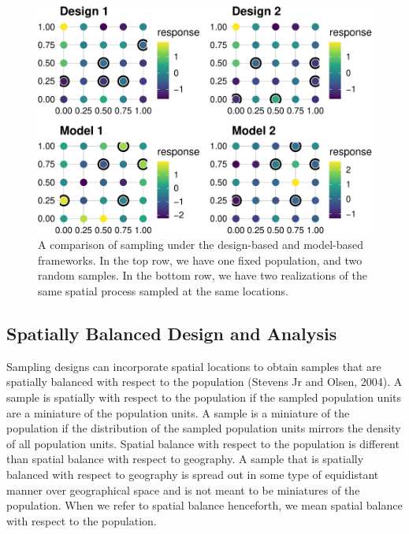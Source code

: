 \documentclass[]{elsarticle} %
\begin{document}
\begin{figure}
\includegraphics[width=1\linewidth]{SpatialDVM_Manuscript_files/figure-latex/unnamed-chunk-2-1} \caption{A comparison of sampling under the design-based and model-based frameworks. In the top row, we have one fixed population, and two random samples. In the bottom row, we have two realizations of the same spatial process sampled at the same locations.}\label{fig:unnamed-chunk-2}
\end{figure}

\hypertarget{spatially-balanced-design-and-analysis}{%
\subsection{Spatially Balanced Design and
Analysis}\label{spatially-balanced-design-and-analysis}}

Sampling designs can incorporate spatial locations to obtain samples
that are spatially balanced with respect to the population (Stevens Jr
and Olsen, 2004). A sample is spatially with respect to the population
if the sampled population units are a miniature of the population units.
A sample is a miniature of the population if the distribution of the
sampled population units mirrors the density of all population units.
Spatial balance with respect to the population is different than spatial
balance with respect to geography. A sample that is spatially balanced
with respect to geography is spread out in some type of equidistant
manner over geographical space and is not meant to be miniatures of the
population. When we refer to spatial balance henceforth, we mean spatial
balance with respect to the population.
\end{document}

